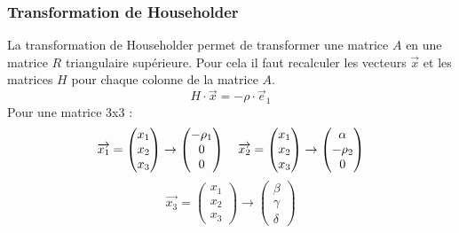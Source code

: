\subsubsection*{Transformation de Householder}
\noindent
La transformation de Householder permet de transformer une matrice $A$ en une
matrice $R$ triangulaire supérieure. Pour cela il faut recalculer les vecteurs
$\overrightarrow{x}$ et les matrices $H$ pour chaque colonne de la matrice $A$.
\begin{equation}
    H\cdot \overrightarrow{x}=-\rho\cdot \overrightarrow{e}_1
    \nonumber
\end{equation}
Pour une matrice 3x3 :
\begin{equation}
    \begin{tabular}{cc}
        $\overrightarrow{x_1}=
            \begin{pmatrix}
                x_1 \\
                x_2 \\
                x_3
            \end{pmatrix}
            \rightarrow
        \begin{pmatrix}
                -\rho_1 \\
                0       \\
                0
            \end{pmatrix}$ &
        $\overrightarrow{x_2}=
            \begin{pmatrix}
                x_1 \\
                x_2 \\
                x_3
            \end{pmatrix}
            \rightarrow
            \begin{pmatrix}
                \alpha  \\
                -\rho_2 \\
                0
            \end{pmatrix}$
    \end{tabular}
    \nonumber
\end{equation}
\begin{equation}
    \overrightarrow{x_3}=
    \begin{pmatrix}
        x_1 \\
        x_2 \\
        x_3
    \end{pmatrix}
    \rightarrow
    \begin{pmatrix}
        \beta  \\
        \gamma \\
        \delta
    \end{pmatrix}
    \nonumber
\end{equation}
